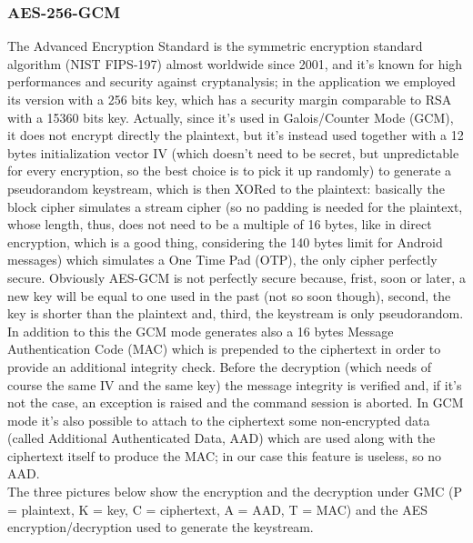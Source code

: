 \documentclass[a4paper,12pt]{article}
\begin{document}
\subsubsection{AES-256-GCM}
\small{The Advanced Encryption Standard is the symmetric encryption standard algorithm (NIST FIPS-197) almost worldwide since 2001, and it's known for high performances and security against cryptanalysis; in the application we employed its version with a 256 bits key, which has a security margin comparable to RSA with a 15360 bits key. Actually, since it's used in Galois/Counter Mode (GCM), it does not encrypt directly the plaintext, but it's instead used together with a 12 bytes initialization vector IV (which doesn't need to be secret, but unpredictable for every encryption, so the best choice is to pick it up randomly) to generate a pseudorandom keystream, which is then XORed to the plaintext: basically the block cipher simulates a stream cipher (so no padding is needed for the plaintext, whose length, thus, does not need to be a multiple of 16 bytes, like in direct encryption, which is a good thing, considering the 140 bytes limit for Android messages) which simulates a One Time Pad (OTP), the only cipher perfectly secure. Obviously AES-GCM is not perfectly secure because, frist, soon or later, a new key will be equal to one used in the past (not so soon though), second, the key is shorter than the plaintext and, third, the keystream is only pseudorandom. In addition to this the GCM mode generates also a 16 bytes Message Authentication Code (MAC) which is prepended to the ciphertext in order to provide an additional integrity check. Before the decryption (which needs of course the same IV and the same key) the message integrity is verified and, if it's not the case, an exception is raised and the command session is aborted. In GCM mode it's also possible to attach to the ciphertext some non-encrypted data (called Additional Authenticated Data, AAD) which are used along with the ciphertext itself to produce the MAC; in our case this feature is useless, so no AAD.\\The three pictures below show the encryption and the decryption under GMC (P = plaintext, K = key, C = ciphertext, A = AAD, T = MAC) and the AES encryption/decryption used to generate the keystream.}\\
\end{document}
